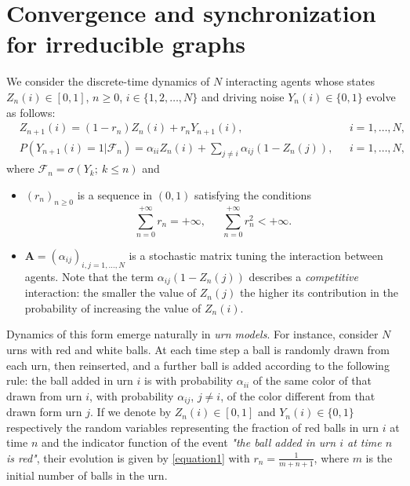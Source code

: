 \documentclass[article,12pt]{article}
\theoremstyle{plain}
\theoremstyle{definition}
\theoremstyle{remark}
\numberwithin{equation}{section}
\numberwithin{theorem}{section}
\begin{document}
		
		
		
		
		\section{Convergence and synchronization for irreducible graphs}\label{sec:irred}
		
		We consider the discrete-time dynamics of $N$ interacting agents whose states $Z_n(i) \in [0,1]$, $n \geq 0$, $i \in \{1,2, \ldots,N\}$ and driving noise $Y_n(i) \in \{0,1\}$ evolve as follows:
		\begin{align} \label{equation1}
			&Z_{n+1}(i)=(1-r_n)Z_n(i) + r_n Y_{n+1}(i),\ \ \ &i=1,\ldots, N,\\
			&P\left(Y_{n+1}(i)=1|\mathcal{F}_n\right) = \alpha_{ii}Z_n(i)+ \sum_{j\neq i}\alpha_{ij} \left(1-Z_n(j)\right),\ \ \  &i=1,\ldots, N,\nonumber
		\end{align} 
		where $\mathcal{F}_n=\sigma(Y_k; \ k\leq n)$ and
		\begin{itemize}
			\item 
			$(r_n)_{n \geq 0}$ is a sequence in $(0,1)$ satisfying the conditions
			\[
			\sum_{n=0}^{+\infty} r_n = +\infty, \quad \ \ \sum_{n=0}^{+\infty} r^2_n < +\infty.
			\]
			\item
			$\mathbf{A}=(\alpha_{i j})_{ i,j=1,\ldots, N}$ is a stochastic matrix tuning the interaction between agents. Note that the term $\alpha_{ij}(1-Z_n(j))$ 
			describes a {\em competitive} interaction: the smaller the value of $Z_n(j)$ the higher its contribution in the probability of increasing the value of $Z_n(i)$. 
			
		\end{itemize}
		Dynamics of this form emerge naturally in {\em urn models}. For instance, consider $N$ urns with red and white balls. At each time step a ball is randomly drawn from each urn, then reinserted, and a further ball is added according to the following rule: the ball added in urn $i$ is with probability $\alpha_{ii}$ of the same color of that drawn from urn $i$, with probability $\alpha_{ij}$, $j \neq i$, of the color different from that drawn form urn $j$. If we denote by $Z_n(i)\in [0,1]$ and $Y_n(i)\in
		\{0, 1\}$  respectively the random variables representing the fraction of red balls in urn $i$ at time $n$ and the indicator function of the event \emph{"the ball added in urn $i$ at time $n$ is red"}, their evolution is given by \eqref{equation1} with $r_n = \frac{1}{m+n+1}$, where $m$ is the initial number of balls in the urn.
		
\end{document}
